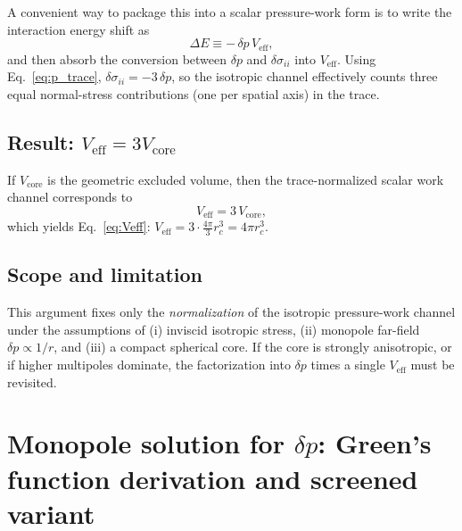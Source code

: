 \documentclass[pdflatex,sn-mathphys-num]{revtex4-2}
\providecommand{\rc}{r_c}
\begin{document}
        A convenient way to package this into a scalar pressure-work form is to write the interaction energy shift as
        \begin{equation}
            \Delta E \equiv -\,\delta p\,V_{\text{eff}},
        \end{equation}
        and then absorb the conversion between \(\delta p\) and \(\delta\sigma_{ii}\) into \(V_{\text{eff}}\).
        Using Eq.~\eqref{eq:p_trace}, \(\delta\sigma_{ii}=-3\,\delta p\), so the isotropic channel effectively counts three
        equal normal-stress contributions (one per spatial axis) in the trace.

    \subsection{Result: \(V_{\text{eff}}=3V_{\text{core}}\)}
        If \(V_{\text{core}}\) is the geometric excluded volume, then the trace-normalized scalar work channel corresponds to
        \begin{equation}
            V_{\text{eff}} = 3\,V_{\text{core}},
        \end{equation}
        which yields Eq.~\eqref{eq:Veff}:
        \(
        V_{\text{eff}} = 3\cdot\frac{4\pi}{3}\rc^3 = 4\pi \rc^3.
        \)

    \subsection{Scope and limitation}
        This argument fixes only the \emph{normalization} of the isotropic pressure-work channel under the assumptions of
        (i) inviscid isotropic stress, (ii) monopole far-field \(\delta p\propto 1/r\), and (iii) a compact spherical core.
        If the core is strongly anisotropic, or if higher multipoles dominate, the factorization into \(\delta p\) times a
        single \(V_{\text{eff}}\) must be revisited.

    \section{Monopole solution for \(\delta p\): Green's function derivation and screened variant}
    \label{app:greens}
\end{document}
